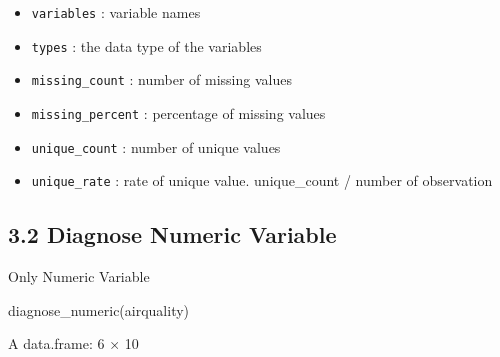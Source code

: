 \documentclass[
  letterpaper,
  DIV=11,
  numbers=noendperiod]{scrreprt}
\newenvironment{Shaded}{\begin{snugshade}}{\end{snugshade}}
\newcommand{\FunctionTok}[1]{\textcolor[rgb]{0.28,0.35,0.67}{#1}}
\newcommand{\NormalTok}[1]{\textcolor[rgb]{0.00,0.23,0.31}{#1}}
\providecommand{\tightlist}{%
  \setlength{\itemsep}{0pt}\setlength{\parskip}{0pt}}\usepackage{longtable,booktabs,array}
\begin{document}
\begin{itemize}
\tightlist
\item
  \texttt{variables} : variable names
\item
  \texttt{types} : the data type of the variables
\item
  \texttt{missing\_count} : number of missing values
\item
  \texttt{missing\_percent} : percentage of missing values
\item
  \texttt{unique\_count} : number of unique values
\item
  \texttt{unique\_rate} : rate of unique value. unique\_count / number
  of observation
\end{itemize}

\subsection{3.2 Diagnose Numeric
Variable}\label{diagnose-numeric-variable}

Only Numeric Variable

\begin{Shaded}
\begin{Highlighting}[]
\FunctionTok{diagnose\_numeric}\NormalTok{(airquality)}
\end{Highlighting}
\end{Shaded}

A data.frame: 6 × 10
\end{document}
